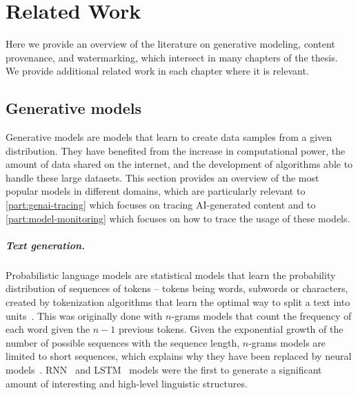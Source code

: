 
\chapter{Related Work}
\label{chapter:related-work}


Here we provide an overview of the literature on generative modeling, content provenance, and watermarking, which intersect in many chapters of the thesis.
We provide additional related work in each chapter where it is relevant.








\section{Generative models}

Generative models are models that learn to create data samples from a given distribution.
They have benefited from the increase in computational power, the amount of data shared on the internet, and the development of algorithms able to handle these large datasets.
This section provides an overview of the most popular models in different domains, which are particularly relevant to \autoref{part:genai-tracing} which focuses on tracing AI-generated content and to \autoref{part:model-monitoring} which focuses on how to trace the usage of these models.


\paragraph{Text generation.}
Probabilistic language models are statistical models that learn the probability distribution of sequences of tokens -- \glspl*{token} being words, subwords or characters, created by tokenization algorithms that learn the optimal way to split a text into units~\citep{sennrich2015neural, kudo2018subword, dagan2024getting}.
This was originally done with $n$-grams models that count the frequency of each word given the $n-1$ previous tokens.
Given the exponential growth of the number of possible sequences with the sequence length, $n$-grams models are limited to short sequences, which explains why they have been replaced by neural models~\citep{bengio2000neural}.
RNN~\citep{mikolov2010recurrent, sutskever2011generating, jozefowicz2016exploring} and LSTM~\citep{hochreiter1997long} models were the first to generate a significant amount of interesting and high-level linguistic structures.

